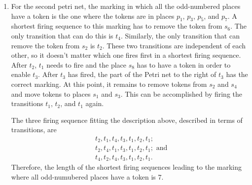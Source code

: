 \documentclass[a4paper,notitlepage]{article}
\begin{document}
\begin{enumerate}[1.]
\begin{enumerate}[1)]
    			\item
    				For the second petri net, the marking in which all the odd-numbered
    				places have a token is the one where the tokens are in places $p_1$,
    				$p_3$, $p_5$, and $p_7$. A shortest firing sequence to this marking has
    				to remove the token from $s_6$. The only transition that can do this is
    				$t_4$. Similarly, the only transition that can remove the token from
    				$s_2$ is $t_2$. These two transitions are independent of each other,
    				so it doesn't matter which one fires first in a shortest firing
    				sequence. After $t_2$, $t_1$ needs to fire and the place $s_8$ has to
    				have a token in order to enable $t_3$. After $t_3$ has fired, the part
    				of the Petri net to the right of $t_3$ has the correct marking. At this
    				point, it remains to remove tokens from $s_2$ and $s_4$ and move tokens
    				to places $s_1$ and $s_3$. This can be accomplished by firing the
    				transitions $t_1$, $t_2$, and $t_1$ again.
    				
    				The three firing sequence fitting the description above, described in
    				terms of transitions, are
    				\begin{align*}
    				    &t_2, t_1, t_4, t_3, t_1, t_2, t_1; \\
    				    &t_2, t_4, t_1, t_3, t_1, t_2, t_1;\text{ and }\\
    				    &t_4, t_2, t_4, t_3, t_1, t_2, t_1.
    				\end{align*}
    				Therefore, the length of the shortest firing sequences leading to the
    				marking where all odd-numubered places have a token is 7.
    				

\end{enumerate}
\end{enumerate}
\end{document}
